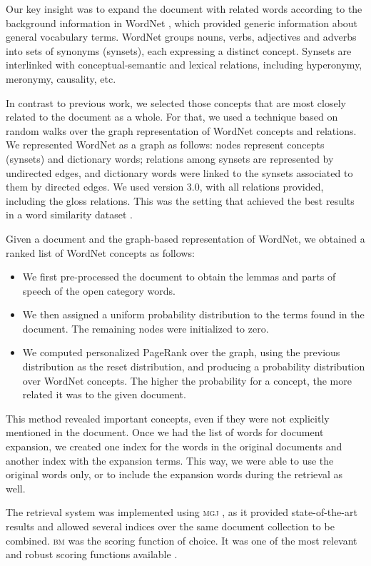 \documentclass[output=paper]{LSP/langsci}
\begin{document}
Our key insight was to expand the document with related words according to the background information in WordNet \citep{Fellbaum1998}, which provided generic information about general vocabulary terms. WordNet groups nouns, verbs, adjectives and adverbs into sets of synonyms (synsets), each expressing a distinct concept. Synsets are interlinked with conceptual-semantic and lexical relations, including hyperonymy, meronymy, causality, etc.

In contrast to previous work, we selected those concepts that are most closely related to the document as a whole. For that, we used a technique based on random walks over the graph representation of WordNet concepts and relations. We represented WordNet as a graph as follows: nodes represent concepts (synsets) and dictionary words; relations among synsets are represented by undirected edges, and dictionary words were linked to the synsets associated to them by directed edges. We used version 3.0, with all relations provided, including the gloss relations. This was the setting that achieved the best results in a word similarity dataset \citep{AgirreEtAl2009a}.


Given a document and the graph-based representation of WordNet, we obtained a ranked list of WordNet concepts as follows:

\begin{itemize}
\item 
We first pre-processed the document to obtain the lemmas and parts of speech of the open category words.
\item  
We then assigned a uniform probability distribution to the terms found in the document. The remaining nodes were initialized to zero.
\item 
We computed personalized PageRank \citep{Haveliwala2002} over the graph, using the previous distribution as the reset distribution, and producing a probability distribution over WordNet concepts. The higher the probability for a concept, the more related it was to the given document.
\end{itemize}

This method revealed important concepts, even if they were not explicitly mentioned in the document. Once we had the list of words for document expansion, we created one index for the words in the original documents and another index with the expansion terms. This way, we were able to use the original words only, or to include the expansion words during the retrieval as well.

The retrieval system was implemented using \textsc{mgj} \citep{Boldi2005}, as it provided state-of-the-art results and allowed several indices over the same document collection to be combined. \textsc{bm} was the scoring function of choice. It was one of the most relevant and robust scoring functions available \citep{Robertson2009}.
\end{document}
